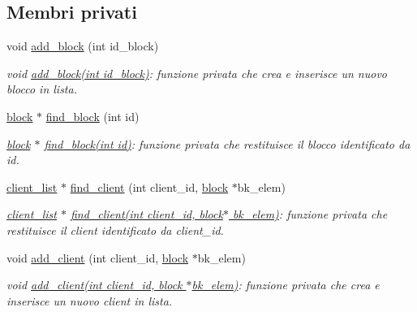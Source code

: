 \subsection*{Membri privati}
\begin{CompactItemize}
\item 
void \hyperlink{classServer_5080669f010965f6b2594d13c4e2f70d_5080669f010965f6b2594d13c4e2f70d}{add\_\-block} (int id\_\-block)
\begin{CompactList}\small\item\em void \hyperlink{classServer_5080669f010965f6b2594d13c4e2f70d_5080669f010965f6b2594d13c4e2f70d}{add\_\-block(int id\_\-block)}: funzione privata che crea e inserisce un nuovo blocco in lista. \item\end{CompactList}\item 
\hyperlink{structblock}{block} $\ast$ \hyperlink{classServer_93fae32902bc34db18eda8513e26fd97_93fae32902bc34db18eda8513e26fd97}{find\_\-block} (int id)
\begin{CompactList}\small\item\em \hyperlink{structblock}{block} $\ast$ \hyperlink{classServer_93fae32902bc34db18eda8513e26fd97_93fae32902bc34db18eda8513e26fd97}{find\_\-block(int id)}: funzione privata che restituisce il blocco identificato da id. \item\end{CompactList}\item 
\hyperlink{structclient__list}{client\_\-list} $\ast$ \hyperlink{classServer_186c395ce5cefdbb598489ddc70f24d2_186c395ce5cefdbb598489ddc70f24d2}{find\_\-client} (int client\_\-id, \hyperlink{structblock}{block} $\ast$bk\_\-elem)
\begin{CompactList}\small\item\em \hyperlink{structclient__list}{client\_\-list} $\ast$ \hyperlink{classServer_186c395ce5cefdbb598489ddc70f24d2_186c395ce5cefdbb598489ddc70f24d2}{find\_\-client(int client\_\-id, block$\ast$ bk\_\-elem)}: funzione privata che restituisce il client identificato da client\_\-id. \item\end{CompactList}\item 
void \hyperlink{classServer_4aa178ff626281eb7a1f0117df69c907_4aa178ff626281eb7a1f0117df69c907}{add\_\-client} (int client\_\-id, \hyperlink{structblock}{block} $\ast$bk\_\-elem)
\begin{CompactList}\small\item\em void \hyperlink{classServer_4aa178ff626281eb7a1f0117df69c907_4aa178ff626281eb7a1f0117df69c907}{add\_\-client(int client\_\-id, block $\ast$bk\_\-elem)}: funzione privata che crea e inserisce un nuovo client in lista. \item\end{CompactList}\item 

\end{CompactItemize}
